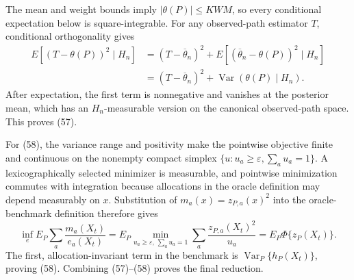 The mean and weight bounds imply \(|\theta(P)|\leq KWM\), so every conditional expectation below is square-integrable. For any observed-path estimator \(T\), conditional orthogonality gives
\[
\begin{aligned}
E[(T-\theta(P))^2\mid H_n]
&=(T-\overline\theta_n)^2
+E[(\overline\theta_n-\theta(P))^2\mid H_n]\\
&=(T-\overline\theta_n)^2
+\operatorname{Var}(\theta(P)\mid H_n).
\end{aligned}
\tag{59}
\]
After expectation, the first term is nonnegative and vanishes at the posterior mean, which has an \(H_n\)-measurable version on the canonical observed-path space. This proves (57).

For (58), the variance range and positivity make the pointwise objective finite and continuous on the nonempty compact simplex \(\{u:u_a\geq\varepsilon,\sum_au_a=1\}\). A lexicographically selected minimizer is measurable, and pointwise minimization commutes with integration because allocations in the oracle definition may depend measurably on \(x\). Substitution of \(m_a(x)=z_{P,a}(x)^2\) into the oracle-benchmark definition therefore gives
\[
\inf_e E_P\sum_a\frac{m_a(X_t)}{e_a(X_t)}
=E_P\min_{u_a\geq\varepsilon,\,\sum_au_a=1}
\sum_a\frac{z_{P,a}(X_t)^2}{u_a}
=E_P\Phi\{z_P(X_t)\}.
\tag{60}
\]
The first, allocation-invariant term in the benchmark is \(\operatorname{Var}_P\{h_P(X_t)\}\), proving (58). Combining (57)--(58) proves the final reduction.